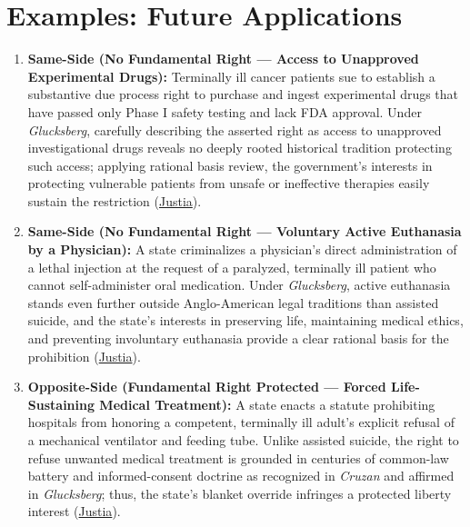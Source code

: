 \documentclass[12pt]{article}
\begin{document}
\section{Examples: Future Applications}

\begin{enumerate}
\item \textbf{Same-Side (No Fundamental Right --- Access to Unapproved Experimental Drugs):} Terminally ill cancer patients sue to establish a substantive due process right to purchase and ingest experimental drugs that have passed only Phase I safety testing and lack FDA approval. Under \textit{Glucksberg}, carefully describing the asserted right as access to unapproved investigational drugs reveals no deeply rooted historical tradition protecting such access; applying rational basis review, the government's interests in protecting vulnerable patients from unsafe or ineffective therapies easily sustain the restriction (\href{https://supreme.justia.com/cases/federal/us/521/702/}{Justia}).

\item \textbf{Same-Side (No Fundamental Right --- Voluntary Active Euthanasia by a Physician):} A state criminalizes a physician's direct administration of a lethal injection at the request of a paralyzed, terminally ill patient who cannot self-administer oral medication. Under \textit{Glucksberg}, active euthanasia stands even further outside Anglo-American legal traditions than assisted suicide, and the state's interests in preserving life, maintaining medical ethics, and preventing involuntary euthanasia provide a clear rational basis for the prohibition (\href{https://supreme.justia.com/cases/federal/us/521/702/}{Justia}).

\item \textbf{Opposite-Side (Fundamental Right Protected --- Forced Life-Sustaining Medical Treatment):} A state enacts a statute prohibiting hospitals from honoring a competent, terminally ill adult's explicit refusal of a mechanical ventilator and feeding tube. Unlike assisted suicide, the right to refuse unwanted medical treatment is grounded in centuries of common-law battery and informed-consent doctrine as recognized in \textit{Cruzan} and affirmed in \textit{Glucksberg}; thus, the state's blanket override infringes a protected liberty interest (\href{https://supreme.justia.com/cases/federal/us/521/702/}{Justia}).


\end{enumerate}
\end{document}
